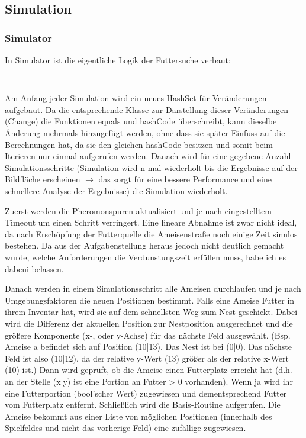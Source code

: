 \documentclass[a4paper,12pt]{scrartcl}
\begin{document}
\subsection*{Simulation}
\subsubsection*{Simulator}
In Simulator ist die eigentliche Logik der Futtersuche verbaut:
\begin{lstlisting}
 
\end{lstlisting}
Am Anfang jeder Simulation wird ein neues HashSet für Veränderungen aufgebaut. Da die entsprechende Klasse zur Darstellung dieser Veränderungen (Change) die Funktionen equals und hashCode überschreibt, kann dieselbe Änderung mehrmals hinzugefügt werden, ohne dass sie später Einfuss auf die Berechnungen hat, da sie den gleichen hashCode besitzen und somit beim Iterieren nur einmal aufgerufen werden. Danach wird für eine gegebene Anzahl Simulationsschritte (Simulation wird n-mal wiederholt bis die Ergebnisse auf der Bildfläche erscheinen $\rightarrow$ das sorgt für eine bessere Performance und eine schnellere Analyse der Ergebnisse) die Simulation wiederholt.

Zuerst werden die Pheromonspuren aktualisiert und je nach eingestelltem Timeout um einen Schritt verringert. Eine lineare Abnahme ist zwar nicht ideal, da nach Erschöpfung der Futterquelle die Ameisenstraße noch einige Zeit \glqq{}sinnlos\grqq{} bestehen. Da aus der Aufgabenstellung heraus jedoch nicht deutlich gemacht wurde, welche Anforderungen die Verdunstungszeit erfüllen muss, habe ich es dabeui belassen.

Danach werden in einem Simulationsschritt alle Ameisen durchlaufen und je nach \glqq{}Umgebungsfaktoren\grqq{} die neuen Positionen bestimmt. Falls eine Ameise Futter in ihrem Inventar hat, wird sie auf dem schnellsten Weg zum Nest geschickt. Dabei wird die Differenz der aktuellen Position zur Nestposition ausgerechnet und die größere Komponente (x-, oder y-Achse) für das nächste Feld ausgewählt. (Bsp. Ameise a befindet sich auf Position (10|13). Das Nest ist bei (0|0). Das nächste Feld ist also (10|12), da der relative y-Wert (13) größer als der relative x-Wert (10) ist.)
Dann wird geprüft, ob die Ameise einen Futterplatz erreicht hat (d.h. an der Stelle (x|y) ist eine Portion an Futter > 0 vorhanden). Wenn ja wird ihr eine Futterportion (bool'scher Wert) zugewiesen und dementsprechend Futter vom Futterplatz entfernt.
Schließlich wird die Basis-Routine aufgerufen. Die Ameise bekommt aus einer Liste von möglichen Positionen (innerhalb des Spielfeldes und nicht das vorherige Feld) eine zufällige zugewiesen.
\end{document}
